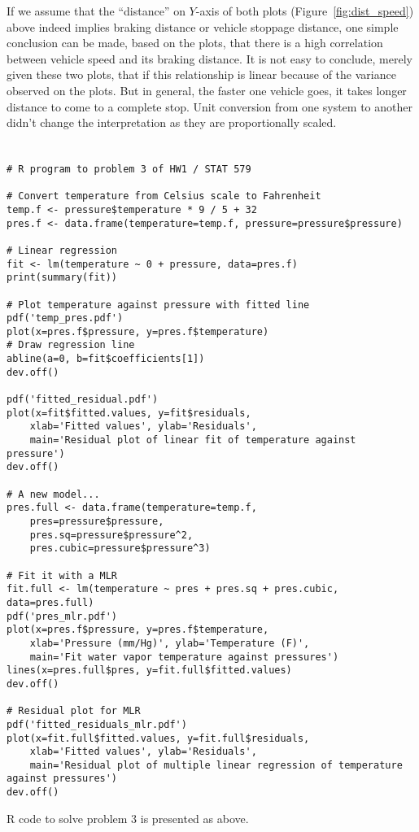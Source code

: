 \documentclass[letter]{article}
\begin{document}
    If we assume that the ``distance'' on $Y$-axis of both plots
    (Figure~\ref{fig:dist_speed}) above indeed
    implies braking distance or vehicle stoppage distance, one simple
    conclusion can be made, based on the plots, that there is a high
    correlation between vehicle speed and its braking distance. It is not easy
    to conclude, merely given these two plots, that if this relationship is
    linear because of the variance observed on the plots. But in general, the
    faster one vehicle goes, it takes longer distance to come to a complete
    stop. Unit conversion from one system to another didn't change the
    interpretation as they are proportionally scaled. 

    \section{}
    \begin{verbatim}
# R program to problem 3 of HW1 / STAT 579

# Convert temperature from Celsius scale to Fahrenheit
temp.f <- pressure$temperature * 9 / 5 + 32
pres.f <- data.frame(temperature=temp.f, pressure=pressure$pressure)

# Linear regression
fit <- lm(temperature ~ 0 + pressure, data=pres.f)
print(summary(fit))

# Plot temperature against pressure with fitted line
pdf('temp_pres.pdf')
plot(x=pres.f$pressure, y=pres.f$temperature)
# Draw regression line
abline(a=0, b=fit$coefficients[1])
dev.off()

pdf('fitted_residual.pdf')
plot(x=fit$fitted.values, y=fit$residuals,
    xlab='Fitted values', ylab='Residuals',
    main='Residual plot of linear fit of temperature against pressure')
dev.off()

# A new model...
pres.full <- data.frame(temperature=temp.f,
    pres=pressure$pressure,
    pres.sq=pressure$pressure^2,
    pres.cubic=pressure$pressure^3)

# Fit it with a MLR
fit.full <- lm(temperature ~ pres + pres.sq + pres.cubic, data=pres.full)
pdf('pres_mlr.pdf')
plot(x=pres.f$pressure, y=pres.f$temperature, 
    xlab='Pressure (mm/Hg)', ylab='Temperature (F)',
    main='Fit water vapor temperature against pressures')
lines(x=pres.full$pres, y=fit.full$fitted.values)
dev.off()

# Residual plot for MLR
pdf('fitted_residuals_mlr.pdf')
plot(x=fit.full$fitted.values, y=fit.full$residuals,
    xlab='Fitted values', ylab='Residuals',
    main='Residual plot of multiple linear regression of temperature against pressures')
dev.off()
    \end{verbatim}
    R code to solve problem 3 is presented as above.
\end{document}
